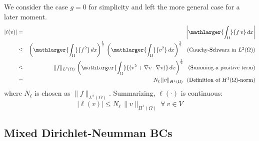 We consider the case $g = 0$ for simplicity and left the more general case for a
later moment.
\begin{eqnarray*}
|\ell(v)| & = & \left | \mathlarger{\int_{\Omega}}{f\,v}\,dx \right | \\
          & \le & \left ( \mathlarger{\int_{\Omega}}{f^2}\,dx \right)^{\frac12} \, \left ( \mathlarger{\int_{\Omega}}{v^2}\,dx \right)^{\frac12}~~\mbox{(Cauchy-Schwarz in $L^2(\Omega)$)} \\
          & \le & \lVert f \rVert_{L^2(\Omega)} \, \left ( \mathlarger{\int_{\Omega}}{(v^2 + \nabla{v}\cdot\nabla{v})}\,dx \right)^{\frac12}  ~~\mbox{(Summing a positive term)}\\
          & = & N_{\ell} \, \lVert v \rVert_{H^1(\Omega)} ~~\mbox{(Definition of $H^1(\Omega)$-norm)}\\
\end{eqnarray*}
where $N_{\ell}$ is chosen as $\lVert f \rVert_{L^2(\Omega)}$.
Summarizing, $\ell(\cdot)$ is continuous:
\begin{equation}
|\ell(v)| \le N_{\ell} \, \lVert v \rVert_{H^1(\Omega)}~\forall~v \in V
\end{equation}

\subsection{Mixed Dirichlet-Neumman BCs}

